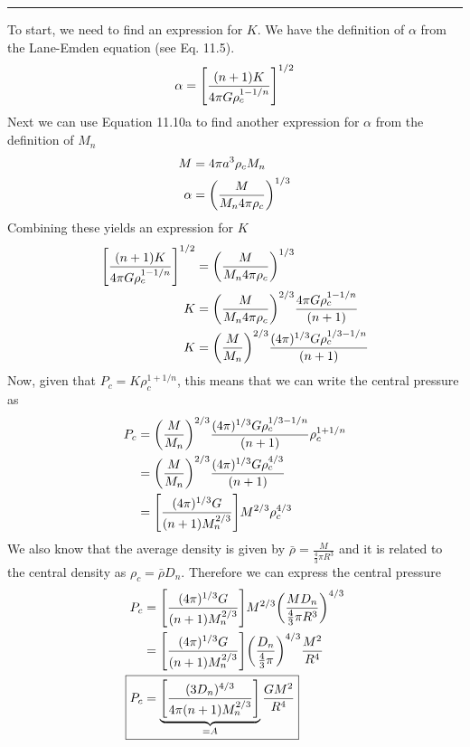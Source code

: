 \documentclass[12pt, letterpaper, twoside]{article}
\newcommand{\answer}[1]{
    \par\noindent\rule{\textwidth}{0.4pt}#1\vspace{0.5cm}
}
\begin{document}
\answer{
    To start, we need to find an expression for $K$. We have the definition of $\alpha$ from the Lane-Emden equation (see Eq. 11.5).
    \begin{equation}
        \alpha = \qty[\frac{(n + 1) K}{4 \pi G \rho_c^{1 - 1/n}}]^{1/2}
    \end{equation}
    Next we can use Equation 11.10a to find another expression for $\alpha$ from the definition of $M_n$
    \begin{align}
        M &= 4 \pi a^3 \rho_c M_n \\
        \alpha &= \qty(\frac{M}{M_n 4 \pi \rho_c})^{1/3}
    \end{align}
    Combining these yields an expression for $K$
    \begin{align}
        \qty[\frac{(n + 1) K}{4 \pi G \rho_c^{1 - 1/n}}]^{1/2} &= \qty(\frac{M}{M_n 4 \pi \rho_c})^{1/3} \\
        K &= \qty(\frac{M}{M_n 4 \pi \rho_c})^{2/3} \frac{4 \pi G \rho_c^{1 - 1 / n}}{(n + 1)} \\
        K &= \qty(\frac{M}{M_n})^{2/3} \frac{(4 \pi)^{1/3} G \rho_c^{1/3 - 1 / n}}{(n + 1)}
    \end{align}
    Now, given that $P_c = K \rho_c^{1 + 1/n}$, this means that we can write the central pressure as
    \begin{align}
        P_c &= \qty(\frac{M}{M_n})^{2/3} \frac{(4 \pi)^{1/3} G \rho_c^{1/3 - 1 / n}}{(n + 1)} \rho_c^{1 + 1 / n} \\
            &= \qty(\frac{M}{M_n})^{2/3} \frac{(4 \pi)^{1/3} G \rho_c^{4/3}}{(n + 1)} \\
            &= \qty[\frac{(4 \pi)^{1/3} G}{(n + 1) M_n^{2/3}}] M^{2/3} \rho_c^{4/3}
    \end{align}
    We also know that the average density is given by $\bar{\rho} = \frac{M}{\frac{4}{3} \pi R^3}$ and it is related to the central density as $\rho_c = \bar{\rho} D_n$. Therefore we can express the central pressure
    \begin{align}
        P_c &= \qty[\frac{(4 \pi)^{1/3} G}{(n + 1) M_n^{2/3}}] M^{2/3} \qty(\frac{M D_n}{\frac{4}{3} \pi R^3})^{4/3} \\
            &= \qty[\frac{(4 \pi)^{1/3} G}{(n + 1) M_n^{2/3}}] \qty(\frac{D_n}{\frac{4}{3} \pi})^{4/3} \frac{M^2}{R^4} \\
        \Aboxed{ P_c &= \underbrace{\qty[\frac{(3 D_n)^{4/3}}{4 \pi (n + 1) M_n^{2/3}}]}_{=A} \frac{G M^2}{R^4} }
    \end{align}
}
\end{document}
